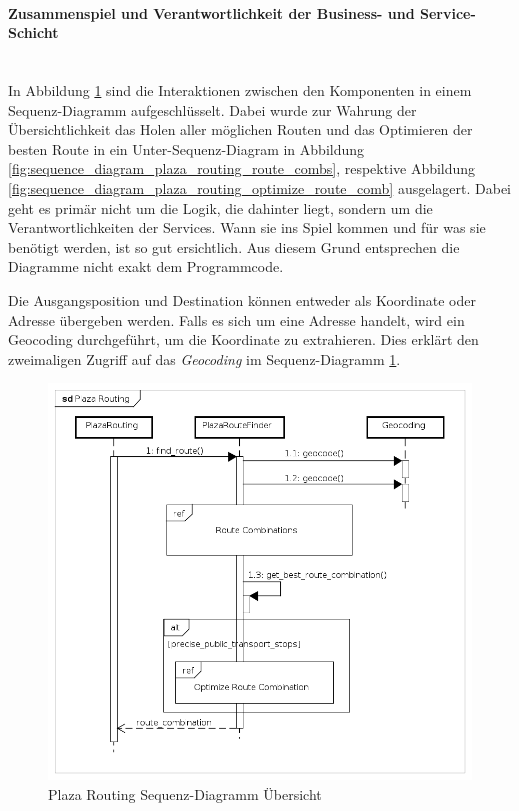 \paragraph{Zusammenspiel und Verantwortlichkeit der Business- und Service-Schicht}\label{impl:Plaza Routing Zusammenspielund Verantwortlichkeit der Business- und Service-Schicht}~\\
In Abbildung \ref{fig:sequence_diagram_plaza_routing_overview} sind die Interaktionen zwischen den Komponenten in einem Sequenz-Diagramm aufgeschlüsselt. Dabei wurde zur Wahrung der Übersichtlichkeit das Holen aller möglichen Routen und das Optimieren der besten Route in ein Unter-Sequenz-Diagram in Abbildung \ref{fig:sequence_diagram_plaza_routing_route_combs}, respektive Abbildung \ref{fig:sequence_diagram_plaza_routing_optimize_route_comb} ausgelagert. Dabei geht es primär nicht um die Logik, die dahinter liegt, sondern um die Verantwortlichkeiten der Services. Wann sie ins Spiel kommen und für was sie benötigt werden, ist so gut ersichtlich. Aus diesem Grund entsprechen die Diagramme nicht exakt dem Programmcode. 

Die Ausgangsposition und Destination können entweder als Koordinate oder Adresse übergeben werden. Falls es sich um eine Adresse handelt, wird ein Geocoding durchgeführt, um die Koordinate zu extrahieren. Dies erklärt den zweimaligen Zugriff auf das \emph{Geocoding} im Sequenz-Diagramm \ref{fig:sequence_diagram_plaza_routing_overview}.

\begin{figure}[ht]
    \centering
    \includegraphics[width=0.7\linewidth]{projectdoc/img/sequence_diagram_plaza_routing_overview}
    \caption[Plaza Routing Sequenz-Diagramm Übersicht]{Plaza Routing Sequenz-Diagramm Übersicht}
    \label{fig:sequence_diagram_plaza_routing_overview}
\end{figure}

